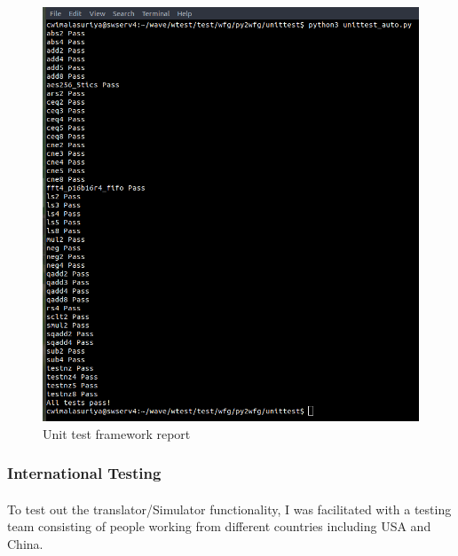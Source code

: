 \begin{figure}[H]
    \centering
    \includegraphics[trim=0cm 0cm 0cm 0cm, clip=true,scale=0.5]{figures/utest.png}
    \caption{Unit test framework report\label{Fig:utest}}\vspace{-4mm}
    \end{figure}

\subsubsection{International Testing}
\paragraph{}
To test out the translator/Simulator functionality, I was facilitated with a testing team consisting of people working from different countries including USA and China.


